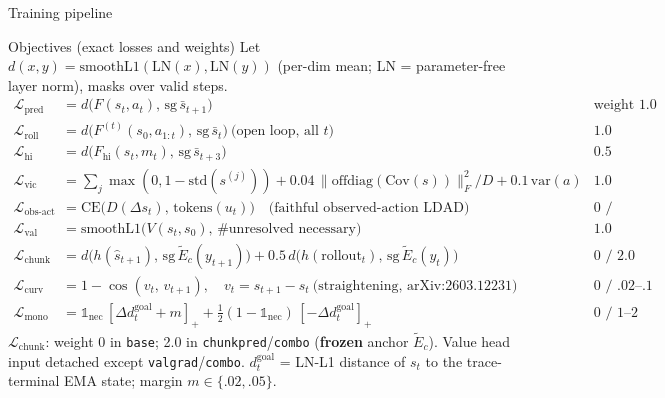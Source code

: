\documentclass[aspectratio=169,10pt]{beamer}
\newcommand{\sg}{\mathrm{sg}}
\begin{document}
\begin{frame}{Training pipeline}
{}
\end{frame}

\begin{frame}{Objectives (exact losses and weights)}
Let $d(x,y)=\mathrm{smoothL1}(\mathrm{LN}(x),\mathrm{LN}(y))$ (per-dim mean;
LN = parameter-free layer norm), masks over valid steps.
\begin{align*}
\mathcal L_{\text{pred}} &= d\big(F(s_t,a_t),\, \sg\,\bar s_{t+1}\big)
  &\text{weight } 1.0\\
\mathcal L_{\text{roll}} &= d\big(F^{(t)}(s_0,a_{1:t}),\, \sg\,\bar s_{t}\big)
  \ \text{(open loop, all $t$)} &1.0\\
\mathcal L_{\text{hi}} &= d\big(F_{\mathrm{hi}}(s_t, m_t),\, \sg\,\bar s_{t+3}\big)
  &0.5\\
\mathcal L_{\text{vic}} &= \textstyle\sum_j \max(0, 1-\mathrm{std}(s^{(j)}))
  + 0.04\,\|\mathrm{offdiag}(\mathrm{Cov}(s))\|_F^2/D + 0.1\,\text{var}(a)
  &1.0\\
\mathcal L_{\text{obs-act}} &= \mathrm{CE}\big(D(\Delta s_t),\,
  \mathrm{tokens}(u_t)\big)\quad\text{(faithful observed-action LDAD)}
  &\text{0 / selected}\\
\mathcal L_{\text{val}} &= \mathrm{smoothL1}\big(V(s_t,s_0),\,
  \#\text{unresolved necessary}\big) &1.0\\
\mathcal L_{\text{chunk}} &= d\big(h(\hat s_{t+1}),\, \sg\,\tilde E_c(y_{t+1})\big)
  + 0.5\, d\big(h(\text{rollout}_t),\, \sg\,\tilde E_c(y_t)\big)
  &\text{0 / 2.0}\\
\mathcal L_{\text{curv}} &= 1-\cos(v_t,\,v_{t+1}),\quad v_t = s_{t+1}-s_t
  \ \text{(straightening, arXiv:2603.12231)} &\text{0 / .02--.1}\\
\mathcal L_{\text{mono}} &= \mathbb 1_{\text{nec}}\,[\Delta d^{\text{goal}}_t
  + m]_+ + \tfrac12(1-\mathbb 1_{\text{nec}})\,[-\Delta d^{\text{goal}}_t]_+
  &\text{0 / 1--2}
\end{align*}
$\mathcal L_{\text{chunk}}$: weight 0 in \texttt{base}; 2.0 in
\texttt{chunkpred}/\texttt{combo} (\textbf{frozen} anchor
$\tilde E_c$). Value head input detached except
\texttt{valgrad}/\texttt{combo}. $d^{\text{goal}}_t$ = LN-L1 distance
of $s_t$ to the trace-terminal EMA state; margin $m\in\{.02,.05\}$.
\end{frame}
\end{document}
